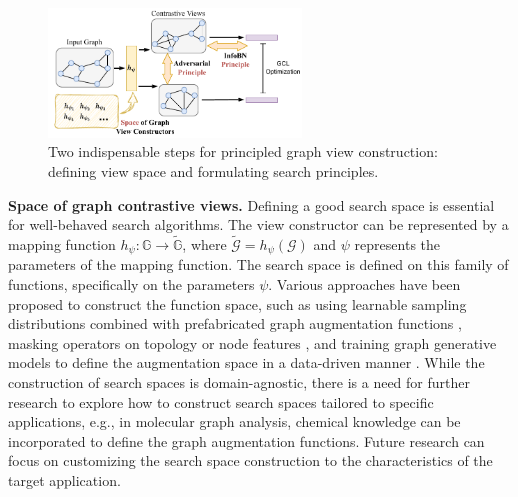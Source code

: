 \documentclass[11pt]{article}
\begin{document}
\begin{figure}
  \vspace{-2em}
  \begin{center}
    \includegraphics[width=0.6\textwidth]{submissions/Yan2023/figures/principles.drawio.pdf}
  \end{center}
  \vspace{-1.5em}
  \caption{Two indispensable steps for principled graph view construction: defining view space and formulating search principles.} \label{fig:principle}
  \vspace{-1em}
\end{figure}

\textbf{Space of graph contrastive views.}
Defining a good search space is essential for well-behaved search algorithms. The view constructor can be represented by a mapping function $h_\psi: \mathbb{G} \rightarrow \tilde{\mathbb{G}}$, where $\tilde{\mathcal{G}} = h_\psi(\mathcal{G})$ and $\psi$ represents the parameters of the mapping function. The search space is defined on this family of functions, specifically on the parameters $\psi$. Various approaches have been proposed to construct the function space, such as using learnable sampling distributions combined with prefabricated graph augmentation functions \cite{you2021graph}, masking operators on topology or node features \cite{zhu2021graph, suresh2021adversarial}, and training graph generative models to define the augmentation space in a data-driven manner \cite{you2022bringing, yin2022autogcl}. While the construction of search spaces is domain-agnostic, there is a need for further research to explore how to construct search spaces tailored to specific applications, e.g., in molecular graph analysis, chemical knowledge can be incorporated to define the graph augmentation functions. Future research can focus on customizing the search space construction to the characteristics of the target application.
\end{document}
